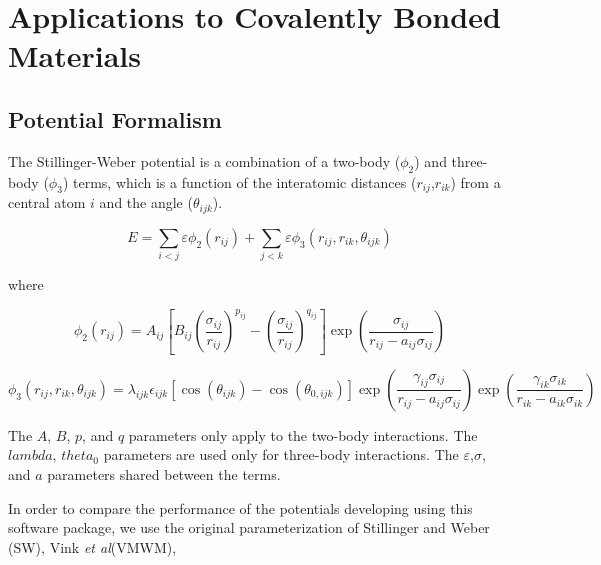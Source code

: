 \chapter{Applications to Covalently Bonded Materials}

\section{Potential Formalism}
The Stillinger-Weber potential\cite{stillinger1985_sw} is a combination of a two-body ($\phi_2$) and three-body ($\phi_3$) terms, which is a function of the interatomic distances ($r_{ij}$,$r_{ik}$) from a central atom $i$ and the angle ($\theta_{ijk}$).

\begin{equation}
    E = \sum_{i<j}\varepsilon \phi_2 (r_{ij})
        +\sum_{j<k}\varepsilon \phi_3 (r_{ij},r_{ik},\theta_{ijk})
\end{equation}

where

\begin{equation}
    \phi_2(r_{ij})=A_{ij} \left[
        B_{ij}
        \left(\frac{\sigma_{ij}}{r_{ij}}\right)^{p_{ij}}
        - \left(\frac{\sigma_{ij}}{r_{ij}}\right)^{q_{ij}}
    \right]
    \exp\left(\frac{\sigma_{ij}}{r_{ij}-a_{ij}\sigma_{ij}}\right)
\end{equation}

\begin{equation}
    \phi_3(r_{ij},r_{ik},\theta_{ijk}) =
        \lambda_{ijk}
        \epsilon_{ijk}
        \left[
            \cos(\theta_{ijk}) - \cos(\theta_{0,ijk})
        \right]
        \exp\left(\frac{\gamma_{ij}\sigma_{ij}}
                       {r_{ij}-a_{ij}\sigma_{ij}}
            \right)
        \exp\left(\frac{\gamma_{ik}\sigma_{ik}}
                       {r_{ik}-a_{ik}\sigma_{ik}}
            \right)
\end{equation}

The $A$, $B$, $p$, and $q$ parameters only apply to the two-body interactions.
The $lambda$, $theta_0$ parameters are used only for three-body interactions.
The $\varepsilon$,$\sigma$, and $a$ parameters shared between the terms.

In order to compare the performance of the potentials developing using this software package, we use the original parameterization of Stillinger and Weber (SW)\cite{stillinger1985_sw}, Vink \emph{et al}(VMWM)\cite{vink2001_sw_Si},

